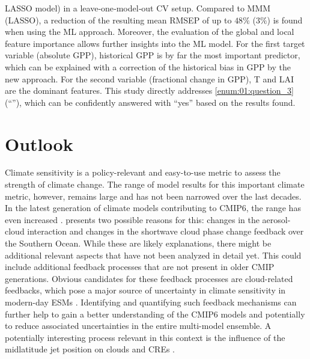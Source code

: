\ac{LASSO} model) in a leave‐one‐model‐out \ac{CV} setup. Compared to \ac{MMM}
(\ac{LASSO}), a reduction of the resulting mean \ac{RMSEP} of up to $48
\unit{\%}$ ($3 \unit{\%}$) is found when using the \ac{ML} approach. Moreover,
the evaluation of the global and local feature importance allows further
insights into the \ac{ML} model. For the first target variable (absolute
\ac{GPP}), historical \ac{GPP} is by far the most important predictor, which
can be explained with a correction of the historical bias in \ac{GPP} by the
new approach. For the second variable (fractional change in \ac{GPP}), \ac{T}
and \ac{LAI} are the dominant features. This study directly addresses
\cref{enum:01:question_3} (\enquote{\emph{\KeyScienceQuestionThree{}}}), which
can be confidently answered with \enquote{yes} based on the results found.


\section{Outlook}
\label{sec:07:outlook}

Climate sensitivity is a policy-relevant and easy-to-use metric to assess the
strength of climate change. The range of model results for this important
climate metric, however, remains large and has not been narrowed over the last
decades. In the latest generation of climate models contributing to
\acs{CMIP}6, the range has even increased \autocite{Meehl2020}.
 presents two possible reasons for this:
changes in the aerosol-cloud interaction and changes in the shortwave cloud
phase change feedback over the Southern Ocean. While these are likely
explanations, there might be additional relevant aspects that have not been
analyzed in detail yet. This could include additional feedback processes that
are not present in older \ac{CMIP} generations. Obvious candidates for these
feedback processes are cloud-related feedbacks, which pose a major source of
uncertainty in climate sensitivity in modern-day \acp{ESM}
\autocite{Boucher2013}. Identifying and quantifying such feedback mechanisms
can further help to gain a better understanding of the \acs{CMIP}6 models and
potentially to reduce associated uncertainties in the entire multi-model
ensemble. A potentially interesting process relevant in this context is the
influence of the midlatitude jet position on clouds and \acp{CRE}
\autocite{Grise2016}.

